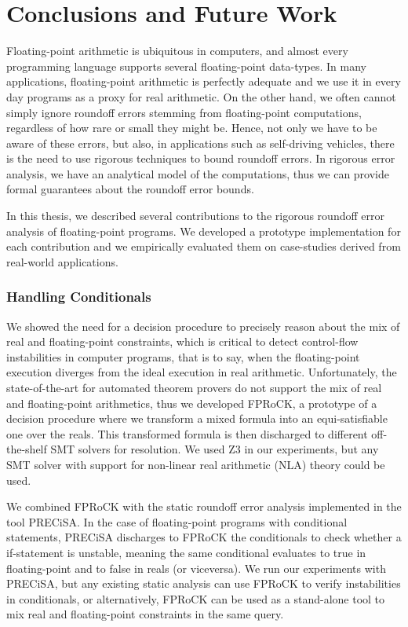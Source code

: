
\chapter{Conclusions and Future Work}
\label{sec:conclusion}
%
\setupuuchapterbib
%
Floating-point arithmetic is ubiquitous in computers, and almost every programming language supports several floating-point data-types.
%
In many applications, floating-point arithmetic is perfectly adequate and we use it in every day programs as a proxy for real arithmetic.
%
On the other hand, we often cannot simply ignore roundoff errors stemming from floating-point computations, regardless of how rare or small they might be.
%
Hence, not only we have to be aware of these errors, but also, in applications such as self-driving vehicles, there is the need to use rigorous techniques to bound roundoff errors. 
%
In rigorous error analysis, we have an analytical model of the computations, thus we can provide formal guarantees about the roundoff error bounds.
%

In this thesis, we described several contributions to the rigorous roundoff error analysis of floating-point programs.
%
We developed a prototype implementation for each contribution and we empirically evaluated them on case-studies derived from real-world applications.
%

\subsection{Handling Conditionals}
%
We showed the need for a decision procedure to precisely reason about the mix of real and floating-point constraints, which is critical to detect control-flow instabilities in computer programs, that is to say, when the floating-point execution diverges from the ideal execution in real arithmetic.
%
Unfortunately, the state-of-the-art for automated theorem provers do not support the mix of real and floating-point arithmetics, thus we developed FPRoCK, a prototype of a decision procedure where we transform a mixed formula
into an equi-satisfiable one over the reals.
%
This transformed formula is then discharged to different off-the-shelf SMT solvers for resolution.
%
We used Z3 in our experiments, but any SMT solver with support for non-linear real arithmetic (NLA) theory could be used.
%

We combined FPRoCK with the static roundoff error analysis implemented in the tool PRECiSA.
%
In the case of floating-point programs with conditional statements, PRECiSA discharges to FPRoCK the conditionals to check whether a if-statement is unstable, meaning the same conditional evaluates to true in floating-point and to false in reals (or viceversa).
%
We run our experiments with PRECiSA, but any existing static analysis can use FPRoCK to verify instabilities in conditionals, or alternatively, FPRoCK can be used as a stand-alone tool to mix real and floating-point constraints in the same query.
%

